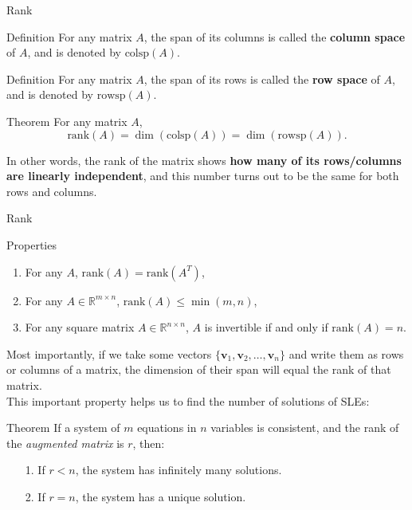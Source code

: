 \documentclass{beamer}
\newcommand{\vv}{\mathbf{v}}
\newcommand{\R}{\mathbb{R}}
\newcommand{\rank}{\text{rank}}
\begin{document}
\begin{frame}{Rank}


\begin{block}{Definition}
    For any matrix $A$, the span of its columns is called the \textbf{column space} of $A$, and is denoted by $\text{colsp}(A)$.
\end{block}
\pause
\begin{block}{Definition}
    For any matrix $A$, the span of its rows is called the \textbf{row space} of $A$, and is denoted by $\text{rowsp}(A)$.
\end{block}
\pause
\begin{block}{Theorem}
For any matrix $A$, \[\rank(A) = \dim(\text{colsp}(A)) = \dim(\text{rowsp}(A)).\]
\end{block}
In other words, the rank of the matrix shows \textbf{how many of its rows/columns are linearly independent}, and this number turns out to be the same for both rows and columns.
\end{frame}


\begin{frame}{Rank}
\begin{block}{Properties}
\begin{enumerate}[<+->]
    \item For any $A$, $\rank(A)=\rank(A^T)$,
    \item For any $A\in\R^{m\times n}$, $\rank(A) \le \min(m, n)$,
    \item For any square matrix $A\in\R^{n\times n}$, $A$ is invertible if and only if $\rank(A)=n$.\end{enumerate}
\end{block}
    \pause

Most importantly, if we take some vectors $\{\vv_1, \vv_2, \dots, \vv_n\}$ and write them as rows or columns of a matrix, the dimension of their span will equal the rank of that matrix. \\ 
\pause This important property helps us to find the number of solutions of SLEs:
\begin{block}{Theorem}
    If a system of $m$ equations in $n$ variables is consistent, and the rank of the \textit{augmented matrix} is $r$, then:
\begin{enumerate}
    \item[1. ] If $r < n$, the system has infinitely many solutions.
\item[2. ] If $r = n$, the system has a unique solution.
\end{enumerate}
\end{block}

\end{frame}
\end{document}
